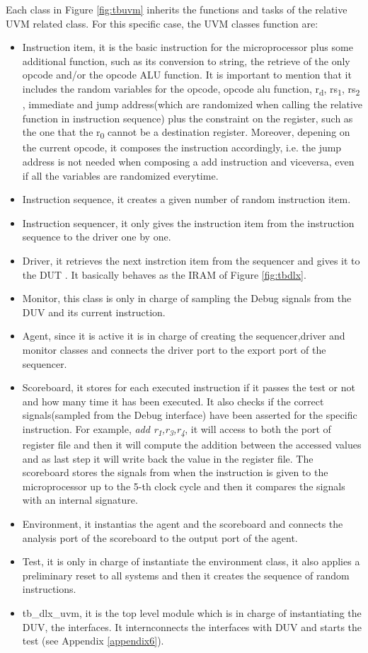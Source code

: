 Each class in Figure \ref{fig:tbuvm} inherits the functions and tasks of the relative UVM related class. For this specific case, the UVM classes function are:
\begin{itemize}
\item Instruction item, it is the basic instruction for the microprocessor plus some additional function, such as its conversion to string, the retrieve of the only opcode and/or the opcode ALU function. It is important to mention that it includes the random variables for the opcode, opcode alu function, r\textsubscript{d}, rs\textsubscript{1}, rs\textsubscript{2} , immediate and jump address(which are randomized when calling the relative function in instruction sequence) plus the constraint on the register, such as the one that the r\textsubscript{0} cannot be a destination register. Moreover, depening on the current opcode, it composes the instruction accordingly, i.e. the jump address is not needed when composing a add instruction and viceversa, even if all the variables are randomized everytime.
\item Instruction sequence, it creates a given number of random instruction item.
\item Instruction sequencer, it only gives the instruction item from the instruction sequence to the driver one by one.
\item Driver, it retrieves the next instrction item from the sequencer and gives it to the DUT . It basically behaves as the IRAM of Figure \ref{fig:tbdlx}.
\item Monitor, this class is only in charge of sampling the Debug signals from the DUV and its current instruction.
\item Agent, since it is active it is in charge of creating the sequencer,driver and monitor classes and connects the driver port to the export port of the sequencer.
\item Scoreboard, it stores for each executed instruction if it passes the test or not and how many time it has been executed. It also checks if the correct signals(sampled from the Debug interface) have been asserted for the specific instruction. For example, \textit{add r\textsubscript{1},r\textsubscript{3},r\textsubscript{4}}, it will access to both the port of register file and then it will compute the addition between the accessed values and as last step it will write back the value in the register file. The scoreboard stores the signals from when the instruction is given to the microprocessor up to the 5-th clock cycle and then it compares the signals with an internal signature.
\item Environment, it instantias the agent and the scoreboard and connects the analysis port of the scoreboard to the output port of the agent.
\item Test, it is only in charge of instantiate the environment class, it also applies a preliminary reset to all systems and then it creates the sequence of random instructions.
\item tb\_dlx\_uvm, it is the top level module which is in charge of instantiating the DUV, the interfaces. It internconnects the interfaces with DUV and starts the test (see Appendix \ref{appendix6}).
\end{itemize}
